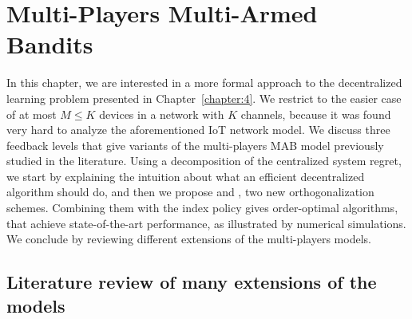 
\chapter{Multi-Players Multi-Armed Bandits}
\label{chapter:5}

\graphicspath{{2-Chapters/5-Chapter/Images/}}
\graphicspath{{2-Chapters/5-Chapter/ALT_2018__MPBandits.git/figures/}}

\abstractStartChapter{}%
%
In this chapter, we are interested in a more formal approach to the decentralized learning problem presented in Chapter~\ref{chapter:4}.
We restrict to the easier case of at most $M \leq K$ devices in a network with $K$ channels, because it was found very hard to analyze the aforementioned IoT network model.
%
We discuss three feedback levels that give variants of the multi-players MAB model previously studied in the literature.
Using a decomposition of the centralized system regret, we start by explaining the intuition about what an efficient decentralized algorithm should do, and then we propose \RandTopM{} and \MCTopM, two new orthogonalization schemes.
Combining them with the \klUCB{} index policy gives order-optimal algorithms, that achieve state-of-the-art performance,
as illustrated by numerical simulations.
We conclude by reviewing different extensions of the multi-players models.

\minitocStartChapter{}




\newpage  %
\section{Literature review of many extensions of the models}
\label{sec:5:literatureReviewOtherModels}

